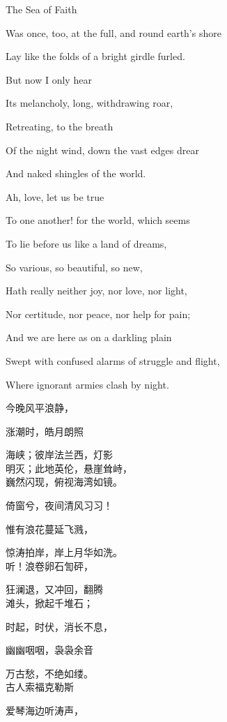 {	The Sea of Faith
	
	Was once, too, at the full, and round earth's shore
	
	Lay like the folds of a bright girdle furled.
	
	But now I only hear
	
	Its melancholy, long, withdrawing roar,
	
	Retreating, to the breath
	
	Of the night wind, down the vast edges drear
	
	And naked shingles of the world.
	
	Ah, love, let us be true
	
	To one another! for the world, which seems
	
	To lie before us like a land of dreams,
	
	So various, so beautiful, so new,
	
	Hath really neither joy, nor love, nor light,
	
	Nor certitude, nor peace, nor help for pain;
	
	And we are here as on a darkling plain
	
	Swept with confused alarms of struggle and flight,
	
	Where ignorant armies clash by night.
}{	

今晚风平浪静，

涨潮时，皓月朗照

海峡；彼岸法兰西，灯影\\


明灭；此地英伦，悬崖耸峙，\\


巍然闪现，俯视海湾如镜。

倚窗兮，夜间清风习习！

惟有浪花蔓延飞溅，

惊涛拍岸，岸上月华如洗。\\


听！浪卷卵石訇砰，

狂澜退，又冲回，翻腾\\


滩头，掀起千堆石；

时起，时伏，消长不息，

幽幽咽咽，袅袅余音

万古愁，不绝如缕。\\



古人索福克勒斯

爱琴海边听涛声，

}
